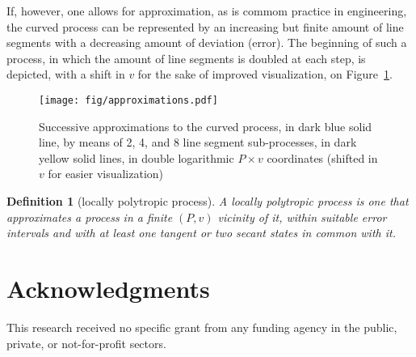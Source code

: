 \documentclass[fleqn,11pt]{SelfArx}
\newtheorem{definition}{Definition}
\begin{document}
    If, however, one allows for approximation, as is commom practice in engineering, the  curved
    process can be represented by an increasing but  finite  amount  of  line  segments  with  a
    decreasing amount of deviation (error). The beginning of such a process, in which the amount
    of line segments is doubled at each step, is depicted, with a shift in $v$ for the  sake  of
    improved visualization, on Figure~\ref{fig:approx}.

    \begin{figure}[ht]
        \centering
        \texttt{[image: fig/approximations.pdf]}
        \caption{Successive approximations to the curved process, in dark blue  solid  line,  by
            means of 2, 4, and 8 line segment sub-processes, in  dark  yellow  solid  lines,  in
            double  logarithmic  $P\times  v$   coordinates   (shifted   in   $v$   for   easier
            visualization)}
        \label{fig:approx}
    \end{figure}

    \begin{definition}[locally polytropic process]\label{def:locally.polytropic}
        A locally polytropic process is one that approximates a  process  in  a  finite  $(P,v)$
        vicinity of it, within suitable error intervals and with at least  one  tangent  or  two
        secant states in common with it.
    \end{definition}

\section*{Acknowledgments}

    This research received no specific grant from any funding agency in the public, private,  or
    not-for-profit sectors.





\end{document}
